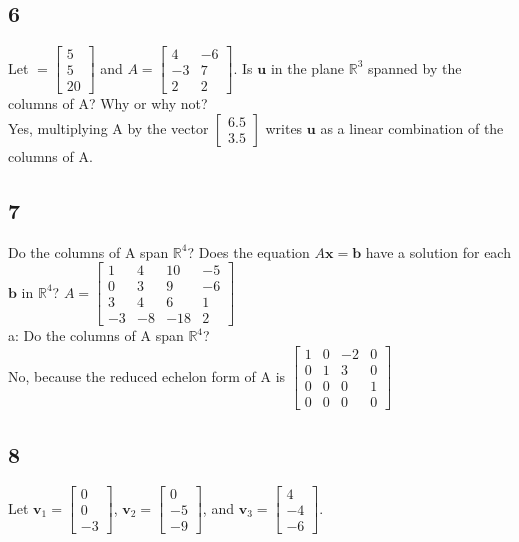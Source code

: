 \documentclass{article}
\begin{document}
\subsection*{6}
Let $\mathbf=\begin{bmatrix}5\\5\\20\end{bmatrix}$ and $A=\begin{bmatrix}4&-6\\-3&7\\2&2\end{bmatrix}$. Is $\mathbf{u}$ in the plane $\mathbb{R}^3$ spanned by the columns of A? Why or why not?
\\[0.1in]Yes, multiplying A by the vector $\begin{bmatrix}6.5\\3.5\end{bmatrix}$ writes $\mathbf{u}$ as a linear combination of the columns of A.
\subsection*{7}
Do the columns of  A span $\mathbb{R}^4$? Does the equation $A\mathbf{x} = \mathbf{b}$ have a solution for each $\mathbf{b}$ in $\mathbb{R}^4$?
$A = \begin{bmatrix}1 & 4 & 10 & -5 \\0 & 3 & 9 & -6 \\3 & 4 & 6 & 1 \\-3 & -8 & -18 & 2\end{bmatrix}$
\\a: Do the columns of  A span $\mathbb{R}^4$?
\\No, because the reduced echelon form of A is $\begin{bmatrix}1&0&-2&0\\0&1&3&0\\0&0&0&1\\0&0&0&0\end{bmatrix}$

\subsection*{8}
Let \( \mathbf{v}_1 = \begin{bmatrix} 0 \\ 0 \\ -3 \end{bmatrix} \),  
\( \mathbf{v}_2 = \begin{bmatrix} 0 \\ -5 \\ -9 \end{bmatrix} \), and  
\( \mathbf{v}_3 = \begin{bmatrix} 4 \\ -4 \\ -6 \end{bmatrix} \).  
\end{document}
